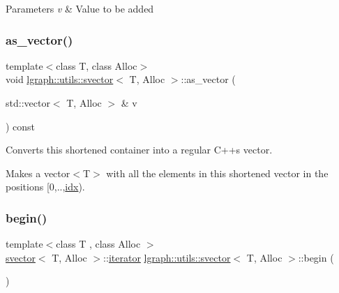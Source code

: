 \begin{DoxyParams}{Parameters}
{\em v} & Value to be added \\
\hline
\end{DoxyParams}
\mbox{\label{classlgraph_1_1utils_1_1svector_a443b6585d588bbc8de631ddeb1abfc58}} 
\subsubsection{\texorpdfstring{as\+\_\+vector()}{as\_vector()}}
{\footnotesize\ttfamily template$<$class T, class Alloc$>$ \\
void \hyperlink{classlgraph_1_1utils_1_1svector}{lgraph\+::utils\+::svector}$<$ T, Alloc $>$\+::as\+\_\+vector (\begin{DoxyParamCaption}\item[{std\+::vector$<$ T, Alloc $>$ \&}]{v }\end{DoxyParamCaption}) const}



Converts this shortened container into a regular C++\textquotesingle{}s vector. 

Makes a vector$<$\+T$>$ with all the elements in this shortened vector in the positions \mbox{[}0,..,\hyperlink{classlgraph_1_1utils_1_1svector_a7ef963c079c7dc8a6a559ceef81a241f}{idx}). \mbox{\label{classlgraph_1_1utils_1_1svector_aeb8b316c538de8368b1efdbf7764ac91}} 
\subsubsection{\texorpdfstring{begin()}{begin()}\hspace{0.1cm}{\footnotesize\ttfamily [1/2]}}
{\footnotesize\ttfamily template$<$class T , class Alloc $>$ \\
\hyperlink{classlgraph_1_1utils_1_1svector}{svector}$<$ T, Alloc $>$\+::\hyperlink{classlgraph_1_1utils_1_1svector_a518288794e754e27d2e2274ced4485a6}{iterator} \hyperlink{classlgraph_1_1utils_1_1svector}{lgraph\+::utils\+::svector}$<$ T, Alloc $>$\+::begin (\begin{DoxyParamCaption}{ }\end{DoxyParamCaption})}



